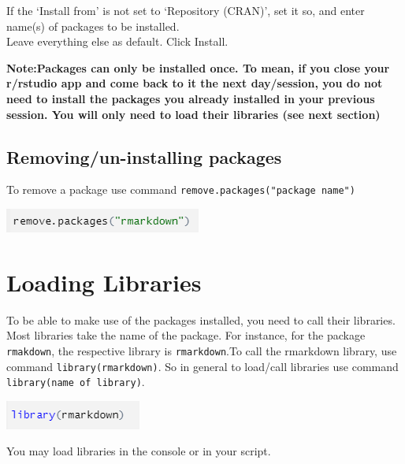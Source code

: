 \documentclass[
]{book}
\let\origfigure\figure
\let\endorigfigure\endfigure
\renewenvironment{figure}[1][2] {
    \expandafter\origfigure\expandafter[H]
} {
    \endorigfigure
}
\begin{document}
If the `Install from' is not set to `Repository (CRAN)', set it so, and enter name(s) of packages to be installed.\\
Leave everything else as default. Click Install.

\textbf{Note:Packages can only be installed once. To mean, if you close your r/rstudio app and come back to it the next day/session, you do not need to install the packages you already installed in your previous session. You will only need to load their libraries (see next section)}

\hypertarget{removingun-installing-packages}{%
\subsection{Removing/un-installing packages}\label{removingun-installing-packages}}

To remove a package use command \texttt{remove.packages("package\ name")}

\begin{figure}
\centering
\includegraphics{tutorial_screenshots/remove_package.png}
\caption{remove packages}
\end{figure}

\hypertarget{loading-libraries}{%
\section{Loading Libraries}\label{loading-libraries}}

To be able to make use of the packages installed, you need to call their libraries. Most libraries take the name of the package. For instance, for the package \texttt{rmakdown}, the respective library is \texttt{rmarkdown}.To call the rmarkdown library, use command \texttt{library(rmarkdown)}.
So in general to load/call libraries use command \texttt{library(name\ of\ library)}.

\begin{figure}
\centering
\includegraphics{tutorial_screenshots/load_library.png}
\caption{load library}
\end{figure}

You may load libraries in the console or in your script.
\end{document}
